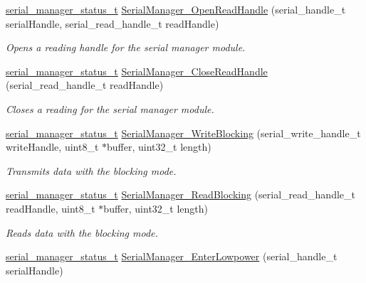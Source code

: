 \begin{DoxyCompactItemize}
\mbox{\hyperlink{group__serialmanager_gac1d9f848c57ca245ad9da8d049369da9}{serial\+\_\+manager\+\_\+status\+\_\+t}} \mbox{\hyperlink{group__serialmanager_ga66915bf8f50a417620ef94951d1df4b8}{Serial\+Manager\+\_\+\+Open\+Read\+Handle}} (serial\+\_\+handle\+\_\+t serial\+Handle, serial\+\_\+read\+\_\+handle\+\_\+t read\+Handle)
\begin{DoxyCompactList}\small\item\em Opens a reading handle for the serial manager module. \end{DoxyCompactList}\item 
\mbox{\hyperlink{group__serialmanager_gac1d9f848c57ca245ad9da8d049369da9}{serial\+\_\+manager\+\_\+status\+\_\+t}} \mbox{\hyperlink{group__serialmanager_ga09c8831eb6ca6e544881dcbf18dcb4a7}{Serial\+Manager\+\_\+\+Close\+Read\+Handle}} (serial\+\_\+read\+\_\+handle\+\_\+t read\+Handle)
\begin{DoxyCompactList}\small\item\em Closes a reading for the serial manager module. \end{DoxyCompactList}\item 
\mbox{\hyperlink{group__serialmanager_gac1d9f848c57ca245ad9da8d049369da9}{serial\+\_\+manager\+\_\+status\+\_\+t}} \mbox{\hyperlink{group__serialmanager_ga3fab1d6bffd89459be9f23d40874248e}{Serial\+Manager\+\_\+\+Write\+Blocking}} (serial\+\_\+write\+\_\+handle\+\_\+t write\+Handle, uint8\+\_\+t $\ast$buffer, uint32\+\_\+t length)
\begin{DoxyCompactList}\small\item\em Transmits data with the blocking mode. \end{DoxyCompactList}\item 
\mbox{\hyperlink{group__serialmanager_gac1d9f848c57ca245ad9da8d049369da9}{serial\+\_\+manager\+\_\+status\+\_\+t}} \mbox{\hyperlink{group__serialmanager_ga03b1bb5c3dbaa5ea2f0a6e7003f0b4eb}{Serial\+Manager\+\_\+\+Read\+Blocking}} (serial\+\_\+read\+\_\+handle\+\_\+t read\+Handle, uint8\+\_\+t $\ast$buffer, uint32\+\_\+t length)
\begin{DoxyCompactList}\small\item\em Reads data with the blocking mode. \end{DoxyCompactList}\item 
\mbox{\hyperlink{group__serialmanager_gac1d9f848c57ca245ad9da8d049369da9}{serial\+\_\+manager\+\_\+status\+\_\+t}} \mbox{\hyperlink{group__serialmanager_ga32cdccd6df5d87f17037f34cf9f1e416}{Serial\+Manager\+\_\+\+Enter\+Lowpower}} (serial\+\_\+handle\+\_\+t serial\+Handle)

\end{DoxyCompactItemize}
